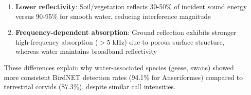 \documentclass[twocolumn]{article}
\begin{document}
\begin{enumerate}
\item \textbf{Lower reflectivity}: Soil/vegetation reflects 30-50\% of incident sound energy versus 90-95\% for smooth water, reducing interference magnitude

\item \textbf{Frequency-dependent absorption}: Ground reflection exhibits stronger high-frequency absorption ($>$5 kHz) due to porous surface structure, whereas water maintains broadband reflectivity
\end{enumerate}

These differences explain why water-associated species (geese, swans) showed more consistent BirdNET detection rates (94.1\% for Anseriformes) compared to terrestrial corvids (87.3\%), despite similar call intensities.
\end{document}
